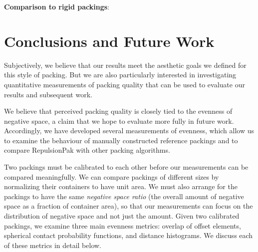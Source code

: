 \textbf{Comparison to rigid packings}: 

\section{Conclusions and Future Work}


Subjectively, we believe that our results meet the aesthetic goals
we defined for this style of packing.  But we are also particularly
interested in investigating quantitative measurements of packing
quality that can be used to evaluate our results and subsequent
work.

We believe that perceived packing quality is closely tied to the evenness
of negative space, a claim that we hope to evaluate more fully in future 
work.  Accordingly, we have developed several measurements of evenness,
which allow us to examine the behaviour of manually constructed reference
packings and to compare RepulsionPak with other packing algorithms.

Two packings must be calibrated to each other before our measurements can be compared meaningfully.  We can
compare packings of different sizes by normalizing their containers to
have unit area.  We must also arrange for the packings to have the same 
\textit{negative space ratio} (the overall amount of negative space as a 
fraction of container area), so that our measurements can focus on the
distribution of negative space and not just the amount.  Given two
calibrated packings, we examine three main evenness metrics:
overlap of offset elements, spherical contact probability functions,
and distance histograms. We discuss each of these metrics in detail below.


